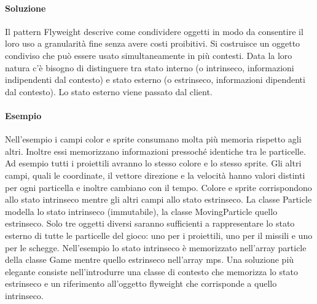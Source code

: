 \paragraph{Soluzione} Il pattern Flyweight descrive come condividere oggetti in modo da consentire il loro uso a granularità fine senza avere costi proibitivi. Si costruisce un oggetto condiviso che può essere usato simultaneamente in più contesti. Data la loro natura c'è bisogno di distinguere tra stato interno (o intrinseco, informazioni indipendenti dal contesto) e stato esterno (o estrinseco, informazioni dipendenti dal contesto). Lo stato esterno viene passato dal client.

\begin{minipage}{0.5\linewidth}
    \paragraph{Esempio} Nell’esempio i campi color e sprite consumano molta più memoria rispetto agli altri. Inoltre essi memorizzano informazioni pressoché identiche tra le particelle. Ad esempio tutti i proiettili avranno lo stesso colore e lo stesso sprite. Gli altri campi, quali le coordinate, il vettore direzione e la velocità hanno valori distinti per ogni particella e inoltre cambiano con il tempo. Colore e sprite corrispondono allo stato intrinseco mentre gli altri campi allo stato estrinseco. La classe Particle modella lo stato intrinseco (immutabile), la classe MovingParticle quello estrinseco. Solo tre oggetti diversi saranno sufficienti a rappresentare lo stato esterno di tutte le particelle del gioco: uno per i proiettili, uno per il missili e uno per le schegge. Nell’esempio lo stato intrinseco è memorizzato nell’array particle della classe Game mentre quello estrinseco nell’array mps. Una soluzione più elegante consiste nell’introdurre una classe di contesto che memorizza lo stato estrinseco e un riferimento all’oggetto flyweight che corrisponde a quello intrinseco.
\end{minipage}
\hfill
